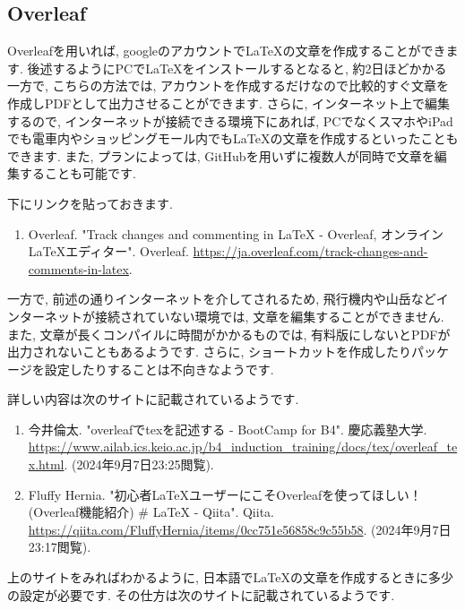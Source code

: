 \documentclass[10pt,a4paper]{jsarticle}
\begin{document}
\subsection{Overleaf}
Overleafを用いれば, googleのアカウントで\LaTeX の文章を作成することができます. 後述するようにPCで\LaTeX をインストールするとなると, 約2日ほどかかる一方で, こちらの方法では, アカウントを作成するだけなので比較的すぐ文章を作成しPDFとして出力させることができます. さらに, インターネット上で編集するので, インターネットが接続できる環境下にあれば, PCでなくスマホやiPadでも電車内やショッピングモール内でも\LaTeX の文章を作成するといったこともできます. また, プランによっては, GitHubを用いずに複数人が同時で文章を編集することも可能です. \par
下にリンクを貼っておきます. 
\begin{enumerate}
    \renewcommand{\labelenumi}{[\arabic{enumi}]\ }
    \setcounter{enumi}{5}
    \item Overleaf. "Track changes and commenting in LaTeX - Overleaf, オンラインLaTeXエディター". Overleaf. \url{https://ja.overleaf.com/track-changes-and-comments-in-latex}. 
\end{enumerate}\par
一方で, 前述の通りインターネットを介してされるため, 飛行機内や山岳などインターネットが接続されていない環境では, 文章を編集することができません. また, 文章が長くコンパイルに時間がかかるものでは, 有料版にしないとPDFが出力されないこともあるようです. さらに, ショートカットを作成したりパッケージを設定したりすることは不向きなようです. \par
詳しい内容は次のサイトに記載されているようです. 
\begin{enumerate}
    \renewcommand{\labelenumi}{[\arabic{enumi}]\ }
    \setcounter{enumi}{6}
    \item 今井倫太. "overleafでtexを記述する - BootCamp for B4". 慶応義塾大学. \url{https://www.ailab.ics.keio.ac.jp/b4_induction_training/docs/tex/overleaf_tex.html}. (2024年9月7日23:25閲覧). 
    \item Fluffy Hernia. "初心者LaTeXユーザーにこそOverleafを使ってほしい！(Overleaf機能紹介) \# LaTeX - Qiita". Qiita. \url{https://qiita.com/FluffyHernia/items/0cc751e56858c9c55b58}. (2024年9月7日23:17閲覧). 
\end{enumerate}
上のサイトをみればわかるように, 日本語で\LaTeX の文章を作成するときに多少の設定が必要です. その仕方は次のサイトに記載されているようです. 
\end{document}
